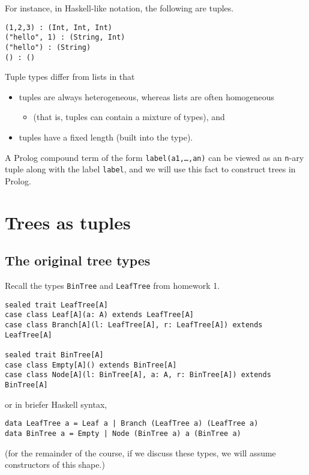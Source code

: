 \documentclass[11pt]{article}
\begin{document}
For instance, in Haskell-like notation, the following are tuples.
\begin{verbatim}
(1,2,3) : (Int, Int, Int)
("hello", 1) : (String, Int)
("hello") : (String)
() : ()
\end{verbatim}

Tuple types differ from lists in that
\begin{itemize}
\item tuples are always heterogeneous,
whereas lists are often homogeneous
\begin{itemize}
\item (that is, tuples can contain a mixture of types), and
\end{itemize}
\item tuples have a fixed length (built into the type).
\end{itemize}

A Prolog compound term of the form \texttt{label(a1,…,an)} can be viewed
as an \texttt{n}-ary tuple along with the label \texttt{label},
and we will use this fact to construct trees in Prolog.

\section{Trees as tuples}
\label{sec:org5270c03}
\subsection{The original tree types}
\label{sec:orgcbfeb4a}
Recall the types \texttt{BinTree} and \texttt{LeafTree} from homework 1.
\begin{verbatim}
sealed trait LeafTree[A]
case class Leaf[A](a: A) extends LeafTree[A]
case class Branch[A](l: LeafTree[A], r: LeafTree[A]) extends LeafTree[A]

sealed trait BinTree[A]
case class Empty[A]() extends BinTree[A]
case class Node[A](l: BinTree[A], a: A, r: BinTree[A]) extends BinTree[A]
\end{verbatim}
or in briefer Haskell syntax,
\begin{verbatim}
data LeafTree a = Leaf a | Branch (LeafTree a) (LeafTree a)
data BinTree a = Empty | Node (BinTree a) a (BinTree a)
\end{verbatim}
(for the remainder of the course, if we discuss these types,
we will assume constructors of this shape.)
\end{document}
